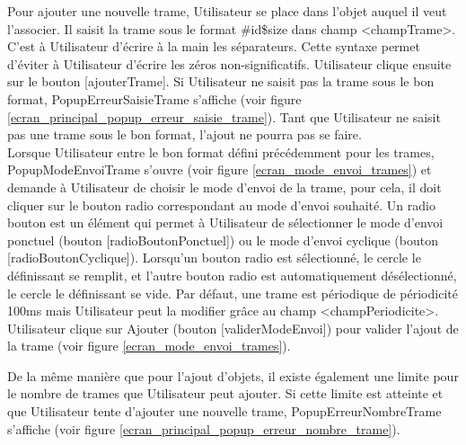 Pour ajouter une nouvelle trame, Utilisateur se place dans l'objet auquel il veut l'associer. Il saisit la trame sous le format {\guillemetleft} \#id\$size\@@message {\guillemetright} dans champ <champTrame>. C'est à Utilisateur d'écrire à la main les séparateurs. Cette syntaxe permet d'éviter à Utilisateur d'écrire les zéros non-significatifs. Utilisateur clique ensuite sur le bouton [ajouterTrame]. Si Utilisateur ne saisit pas la trame sous le bon format, PopupErreurSaisieTrame s'affiche (voir figure \ref{ecran_principal_popup_erreur_saisie_trame}). Tant que Utilisateur ne saisit pas une trame sous le bon format, l'ajout ne pourra pas se faire.
\newline \\
Lorsque Utilisateur entre le bon format défini précédemment pour les trames, PopupModeEnvoiTrame s'ouvre (voir figure \ref{ecran_mode_envoi_trames}) et demande à Utilisateur de choisir le mode d'envoi de la trame, pour cela, il doit cliquer sur le bouton radio correspondant au mode d'envoi souhaité. Un radio bouton est un élément qui permet à Utilisateur de sélectionner le mode d'envoi ponctuel (bouton [radioBoutonPonctuel]) ou le mode d'envoi cyclique (bouton [radioBoutonCyclique]). Lorsqu'un bouton radio est sélectionné, le cercle le définissant se remplit, et l'autre bouton radio est automatiquement désélectionné, le cercle le définissant se vide. Par défaut, une trame est périodique de périodicité 100ms mais Utilisateur peut la modifier grâce au champ <champPeriodicite>. Utilisateur clique sur {\guillemetleft} Ajouter {\guillemetright} (bouton [validerModeEnvoi]) pour valider l'ajout de la trame (voir figure \ref{ecran_mode_envoi_trames}). \newline

De la même manière que pour l'ajout d'objets, il existe également une limite pour le nombre de trames que Utilisateur peut ajouter. Si cette limite est atteinte et que Utilisateur tente d'ajouter une nouvelle trame, PopupErreurNombreTrame s'affiche (voir figure \ref{ecran_principal_popup_erreur_nombre_trame}).
\newline \\

